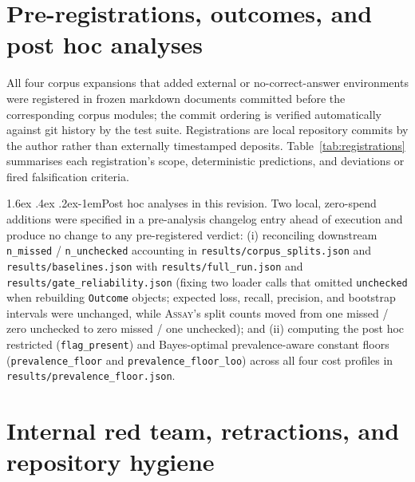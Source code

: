 \documentclass[11pt]{article}
\makeatletter
\renewcommand\paragraph{\@startsection{paragraph}{4}{\z@}%
  {1.6ex \@plus .4ex \@minus .2ex}{-1em}{\normalfont\normalsize\bfseries}}
\newcommand{\assay}{\textsc{Assay}}
\newcommand{\fp}{\texttt{flag\_present}}
\newcommand{\pf}{\texttt{prevalence\_floor}}
\makeatother
\begin{document}

{\footnotesize\setlength{\bibsep}{1pt}}

\appendix

\section{Pre-registrations, outcomes, and post hoc analyses}
\label{app:registrations}

All four corpus expansions that added external or no-correct-answer environments were registered in
frozen markdown documents committed before the corresponding corpus modules; the commit ordering is
verified automatically against git history by the test suite. Registrations are local repository
commits by the author rather than externally timestamped deposits. Table~\ref{tab:registrations}
summarises each registration's scope, deterministic predictions, and deviations or fired
falsification criteria.

\begin{table}[t]\centering\footnotesize

\caption{Summary of the four frozen pre-registrations, their deterministic outcomes, and every
deviation or falsification criterion that fired.}
\label{tab:registrations}
\end{table}

\paragraph{Post hoc analyses in this revision.} Two local, zero-spend additions were specified in a
pre-analysis changelog entry ahead of execution and produce no change to any pre-registered verdict:
(i) reconciling downstream \texttt{n\_missed} / \texttt{n\_unchecked} accounting in
\texttt{results/corpus\_splits.json} and \texttt{results/baselines.json} with
\texttt{results/full\_run.json} and \texttt{results/gate\_reliability.json} (fixing two loader
calls that omitted \texttt{unchecked} when rebuilding \texttt{Outcome} objects; expected loss,
recall, precision, and bootstrap intervals were unchanged, while \assay{}'s split counts moved from
one missed / zero unchecked to zero missed / one unchecked); and (ii) computing the post hoc
restricted (\fp{}) and Bayes-optimal prevalence-aware constant floors (\pf{} and
\texttt{prevalence\_floor\_loo}) across all four cost profiles in
\texttt{results/prevalence\_floor.json}.

\section{Internal red team, retractions, and repository hygiene}
\label{app:selfaudit}
\end{document}
